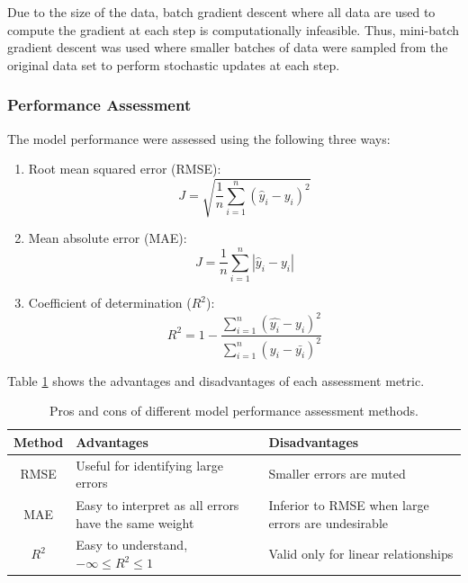 Due to the size of the data, batch gradient descent where all data are used to compute the gradient at each step is computationally infeasible.  Thus, mini-batch gradient descent was used where smaller batches of data were sampled from the original data set to perform stochastic updates at each step.
\subsubsection{Performance Assessment}
The model performance were assessed using the following three ways:
\begin{enumerate}
    \item Root mean squared error (RMSE):
    \begin{equation}
        J = \sqrt{\frac{1}{n}\sum\limits^n_{i=1}(\hat{y}_i - y_i)^2}
        \label{eq:08RMSE}
    \end{equation}
    
    \item Mean absolute error (MAE):
    \begin{equation}
        J = \frac{1}{n}\sum\limits^n_{i=1}|\hat{y}_i - y_i|
        \label{eq:08MSE_Error}
    \end{equation}
    \item Coefficient of determination ($R^2$):
    \begin{equation}
        R^2 = 1 - \frac{\sum\limits^n_{i = 1}(\hat{y_i} - y_i)^2}{\sum\limits^n_{i = 1}(y_i - \bar{y_i})^2}
    \end{equation}
\end{enumerate}
Table \ref{tab:08performanceassessment} shows the advantages and disadvantages of each assessment metric.
\begin{table}[h]
    \centering
    {
    \begin{tabular}{ c | p{6.2cm} | p{6.0cm}}
         Method             & Advantages        &  Disadvantages \\
        \hline
        RMSE                &  Useful for identifying large errors                            &  Smaller errors are muted        \\
        
        MAE                 &  Easy to interpret as all errors have the same weight           &  Inferior to RMSE when large errors are undesirable \\
        
        $R^2$               &  Easy to understand, {\small $-\infty \leq R^2 \leq 1$   }                                      &  Valid only for linear relationships       \\             
    \end{tabular}}
    \caption{Pros and cons of different model performance assessment methods.}
    \label{tab:08performanceassessment}
\end{table}

